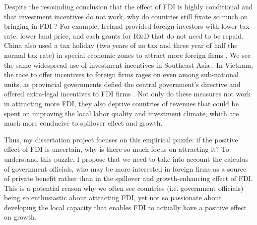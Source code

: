 Despite the resounding conclusion that the effect of FDI is highly conditional and that investment incentives do not work, why do countries still fixate so much on bringing in FDI \citep{Blomstrom2002}? For example, Ireland provided foreign investors with lower tax rate, lower land price, and cash grants for R\&D that do not need to be repaid. China also used a tax holiday (two years of no tax and three year of half the normal tax rate) in special economic zones to attract more foreign firms \citep{Telford2001}. We see the same widespread use of investment incentives in Southeast Asia \citep{Fletcher2002}. In Vietnam, the race to offer incentives to foreign firms rages on even among sub-national units, as provincial governments defied the central government's directive and offered extra-legal incentives to FDI firms \citep{Vu2007}. Not only do these measures not work in attracting more FDI, they also deprive countries of revenues that could be spent on improving the local labor quality and investment climate, which are much more conducive to spillover effect and growth.

Thus, my dissertation project focuses on this empirical puzzle: if the positive effect of FDI is uncertain, why is there so much focus on attracting it? To understand this puzzle, I propose that we need to take into account the calculus of government officials, who may be more interested in foreign firms as a source of private benefit rather than in the spillover and growth-enhancing effect of FDI. This is a potential reason why we often see countries (i.e. government officials) being so enthusiastic about attracting FDI, yet not so passionate about developing the local capacity that enables FDI to actually have a positive effect on growth.